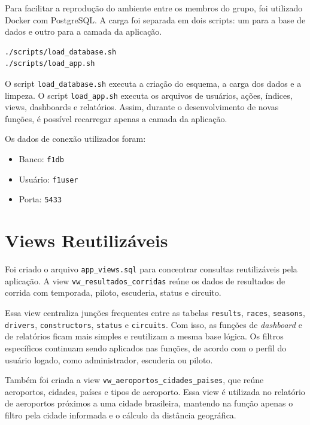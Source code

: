 \documentclass[12pt,a4paper]{article}
\begin{document}
Para facilitar a reprodução do ambiente entre os membros do grupo, foi utilizado Docker com PostgreSQL. A carga foi separada em dois scripts: um para a base de dados e outro para a camada da aplicação.

\begin{lstlisting}[style=sqlstyle]
./scripts/load_database.sh
./scripts/load_app.sh
\end{lstlisting}

O script \texttt{load\_database.sh} executa a criação do esquema, a carga dos dados e a limpeza. O script \texttt{load\_app.sh} executa os arquivos de usuários, ações, índices, views, dashboards e relatórios. Assim, durante o desenvolvimento de novas funções, é possível recarregar apenas a camada da aplicação.

Os dados de conexão utilizados foram:

\begin{itemize}
    \item Banco: \texttt{f1db}
    \item Usuário: \texttt{f1user}
    \item Porta: \texttt{5433}
\end{itemize}

\section{Views Reutilizáveis}

Foi criado o arquivo \texttt{app\_views.sql} para concentrar consultas reutilizáveis pela aplicação. A view \texttt{vw\_resultados\_corridas} reúne os dados de resultados de corrida com temporada, piloto, escuderia, status e circuito.

Essa view centraliza junções frequentes entre as tabelas \texttt{results}, \texttt{races}, \texttt{seasons}, \texttt{drivers}, \texttt{constructors}, \texttt{status} e \texttt{circuits}. Com isso, as funções de \textit{dashboard} e de relatórios ficam mais simples e reutilizam a mesma base lógica. Os filtros específicos continuam sendo aplicados nas funções, de acordo com o perfil do usuário logado, como administrador, escuderia ou piloto.

Também foi criada a view \texttt{vw\_aeroportos\_cidades\_paises}, que reúne aeroportos, cidades, países e tipos de aeroporto. Essa view é utilizada no relatório de aeroportos próximos a uma cidade brasileira, mantendo na função apenas o filtro pela cidade informada e o cálculo da distância geográfica.
\end{document}
